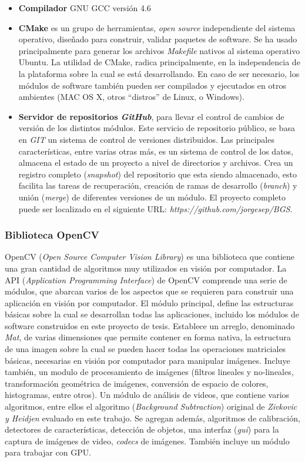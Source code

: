 \begin{itemize}
\item \textbf{Compilador} GNU GCC versión 4.6
\item \textbf{CMake} es un grupo de herramientas, \textit{open source} independiente del sistema operativo, diseñado para construir, validar paquetes de software. Se ha usado principalmente para generar los archivos \textit{Makefile} nativos al sistema operativo Ubuntu. La utilidad de CMake, radica principalmente, en la independencia de la plataforma sobre la cual se está desarrollando. En caso de ser necesario, los módulos de software también pueden ser compilados y ejecutados en otros ambientes (MAC OS X, otros ``distros'' de Linux, o Windows).
\item \textbf{Servidor de repositorios \textit{GitHub}}, para llevar el control de cambios de versión de los distintos módulos. Este servicio de repositorio público, se basa en \textit{GIT} un sistema de control de versiones distribuidos. Las principales características, entre varias otras más, es un sistema de control de los datos, almacena el estado de un proyecto a nivel de directorios y archivos. Crea un registro completo (\textit{snapshot}) del repositorio que esta siendo almacenado, esto facilita las tareas de recuperación, creación de ramas de desarrollo (\textit{branch}) y unión (\textit{merge}) de diferentes versiones de un módulo. El proyecto completo puede ser localizado en el siguiente URL: \textit{https://github.com/jorgesep/BGS}. 
\end{itemize}


\subsubsection{Biblioteca OpenCV}
OpenCV \cite{opencv} (\textit{Open Source Computer Vision Library}) es una biblioteca que contiene una gran cantidad de algoritmos muy utilizados en visión por computador. La API (\textit{Application Programming Interface}) de OpenCV comprende una serie de módulos, que abarcan varios de los aspectos que se requieren para construir una aplicación en visión por computador. El módulo principal, define las estructuras básicas sobre la cual se desarrollan todas las aplicaciones, incluido los módulos de software construidos en este proyecto de tesis. Establece un arreglo, denominado \textit{Mat}, de varias dimensiones que permite contener en forma nativa,  la estructura de una imagen sobre la cual se pueden hacer todas las operaciones matriciales básicas, necesarias en visión por computador para manipular imágenes. Incluye también, un modulo de procesamiento de imágenes (filtros lineales y no-lineales, transformación geométrica de imágenes, conversión de espacio de colores, histogramas, entre otros). Un módulo de análisis de videos, que contiene varios algoritmos, entre ellos el algoritmo (\textit{Background Subtraction}) original de  \textit{Zivkovic y Heidjen} \cite{zivkovic_efficient_2006} evaluado en este trabajo.  Se agregan además, algoritmos de calibración, detectores de características, detección de objetos, una interfaz (\textit{gui}) para la captura de imágenes de video, \textit{codecs} de imágenes. También incluye un módulo para trabajar con GPU.


